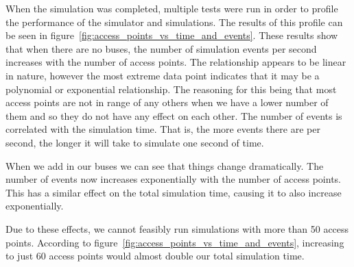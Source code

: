 
            When the simulation was completed, multiple tests were run in order to profile the performance of the simulator and simulations. The results of this profile can be seen in figure~\ref{fig:access_points_vs_time_and_events}. These results show that when there are no buses, the number of simulation events per second increases with the number of access points. The relationship appears to be linear in nature, however the most extreme data point indicates that it may be a polynomial or exponential relationship. The reasoning for this being that most access points are not in range of any others when we have a lower number of them and so they do not have any effect on each other. The number of events is correlated with the simulation time. That is, the more events there are per second, the longer it will take to simulate one second of time. 

            When we add in our buses we can see that things change dramatically. The number of events now increases exponentially with the number of access points. This has a similar effect on the total simulation time, causing it to also increase exponentially. 

            Due to these effects, we cannot feasibly run simulations with more than 50 access points. According to figure~\ref{fig:access_points_vs_time_and_events}, increasing to just 60 access points would almost double our total simulation time. 

